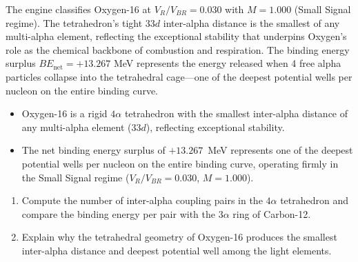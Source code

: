 The engine classifies Oxygen-16 at $V_R/V_{BR} = 0.030$ with $M = 1.000$ (Small Signal regime). The tetrahedron's tight $33d$ inter-alpha distance is the smallest of any multi-alpha element, reflecting the exceptional stability that underpins Oxygen's role as the chemical backbone of combustion and respiration. The binding energy surplus $BE_{\text{net}} = +13.267$ MeV represents the energy released when 4 free alpha particles collapse into the tetrahedral cage---one of the deepest potential wells per nucleon on the entire binding curve.

\begin{summarybox}
\begin{itemize}
    \item Oxygen-16 is a rigid $4\alpha$ tetrahedron with the smallest inter-alpha distance of any multi-alpha element ($33d$), reflecting exceptional stability.
    \item The net binding energy surplus of $+13.267$~MeV represents one of the deepest potential wells per nucleon on the entire binding curve, operating firmly in the Small Signal regime ($V_R/V_{BR} = 0.030$, $M = 1.000$).
\end{itemize}
\end{summarybox}

\begin{exercisebox}
\begin{enumerate}
    \item Compute the number of inter-alpha coupling pairs in the $4\alpha$ tetrahedron and compare the binding energy per pair with the $3\alpha$ ring of Carbon-12.
    \item Explain why the tetrahedral geometry of Oxygen-16 produces the smallest inter-alpha distance and deepest potential well among the light elements.
\end{enumerate}
\end{exercisebox}

